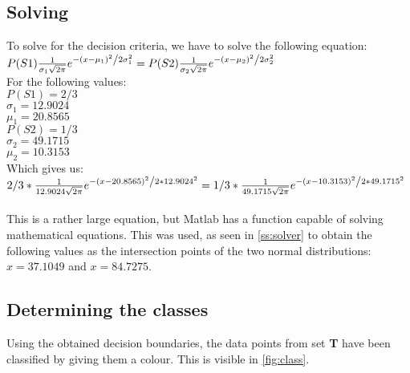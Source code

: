 \documentclass[10pt,a4paper]{article}
\begin{document}
\subsection{Solving}\label{ss:solving}
To solve for the decision criteria, we have to solve the following equation:\\
$
P(S1) \frac{1}{{\sigma_1 \sqrt {2\pi } }}e^{{{ - \left( {x - \mu_1 } \right)^2 } \mathord{\left/ {\vphantom {{ - \left( {x - \mu_1 } \right)^2 } {2\sigma_1 ^2 }}} \right. \kern-\nulldelimiterspace} {2\sigma_1 ^2 }}} = P(S2) \frac{1}{{\sigma_2 \sqrt {2\pi } }}e^{{{ - \left( {x - \mu_2 } \right)^2 } \mathord{\left/ {\vphantom {{ - \left( {x - \mu_2 } \right)^2 } {2\sigma_2 ^2 }}} \right. \kern-\nulldelimiterspace} {2\sigma_2 ^2 }}}
$\\
For the following values:\\
$P(S1) = 2/3$\\
$\sigma_1 = 12.9024$\\
$\mu_1 = 20.8565$\\
$P(S2) = 1/3$\\
$\sigma_2 = 49.1715$\\
$\mu_2 = 10.3153$\\
Which gives us:\\
$
2/3 * \frac{1}{{12.9024 \sqrt {2\pi } }}e^{{{ - \left( {x - 20.8565 } \right)^2 } \mathord{\left/ {\vphantom {{ - \left( {x - 20.85651 } \right)^2 } {2 * 12.9024 ^2 }}} \right. \kern-\nulldelimiterspace} {2 * 12.9024 ^2 }}} = 1/3 * \frac{1}{{49.1715 \sqrt {2\pi } }}e^{{{ - \left( {x - 10.3153 } \right)^2 } \mathord{\left/ {\vphantom {{ - \left( {x - 10.3153 } \right)^2 } {2 * 49.1715 ^2 }}} \right. \kern-\nulldelimiterspace} {2 * 49.1715 ^2 }}}
$\\
\\
This is a rather large equation, but Matlab has a function capable of solving mathematical equations. This was used, as seen in \autoref{ss:solver} to obtain the following values as the intersection points of the two normal distributions: $ x = 37.1049$ and $x = 84.7275$.

\subsection{Determining the classes}
Using the obtained decision boundaries, the data points from set \textbf{T} have been classified by giving them a colour. This is visible in \autoref{fig:class}.
\end{document}
